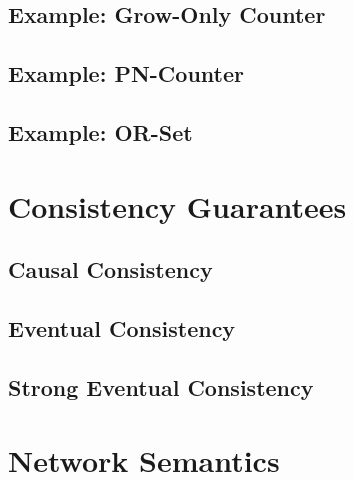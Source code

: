 \subsection{Example: Grow-Only Counter}
\label{sec:example-gcounter}

\subsection{Example: PN-Counter}
\subsection{Example: OR-Set}
\section{Consistency Guarantees}
\subsection{Causal Consistency}
\subsection{Eventual Consistency}
\subsection{Strong Eventual Consistency}
\section{Network Semantics}
